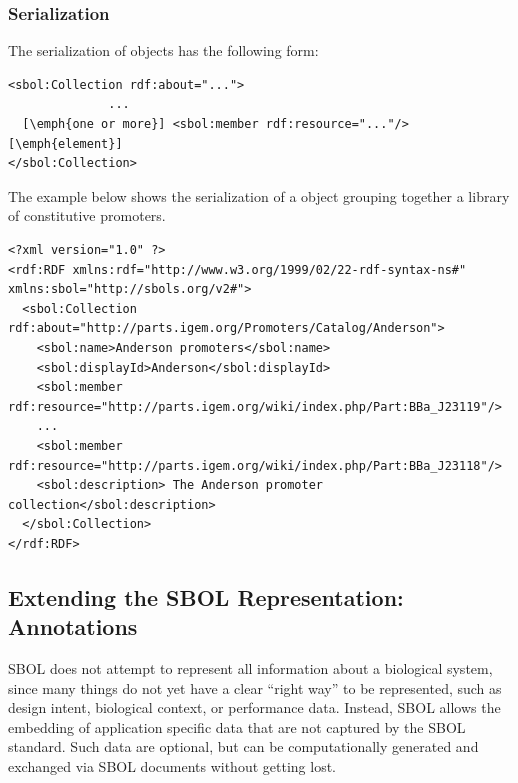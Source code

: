 \subsubsection*{Serialization}

The serialization of  objects has the following form:

\begin{lstlisting}
<sbol:Collection rdf:about="...">
              ...
  [\emph{one or more}] <sbol:member rdf:resource="..."/> [\emph{element}]
</sbol:Collection>
\end{lstlisting}


The example below shows the serialization of a  object grouping together a library of constitutive promoters.
\begin{lstlisting}
<?xml version="1.0" ?>
<rdf:RDF xmlns:rdf="http://www.w3.org/1999/02/22-rdf-syntax-ns#" xmlns:sbol="http://sbols.org/v2#">
  <sbol:Collection rdf:about="http://parts.igem.org/Promoters/Catalog/Anderson">
    <sbol:name>Anderson promoters</sbol:name>
    <sbol:displayId>Anderson</sbol:displayId>
    <sbol:member rdf:resource="http://parts.igem.org/wiki/index.php/Part:BBa_J23119"/>
    ...
    <sbol:member rdf:resource="http://parts.igem.org/wiki/index.php/Part:BBa_J23118"/>
    <sbol:description> The Anderson promoter collection</sbol:description>
  </sbol:Collection>
</rdf:RDF>

\end{lstlisting}
\label{ser:Collection}




\subsection{Extending the SBOL Representation:  Annotations}
\label{sec:annotations}

SBOL does not attempt to represent all information about a biological system, since many things do not yet have a clear ``right way'' to be represented, such as design intent, biological context, or performance data.
Instead, SBOL allows the embedding of application specific data that are not captured by the SBOL standard. 
Such data are optional, but can be computationally generated and exchanged via SBOL documents without getting lost. 

